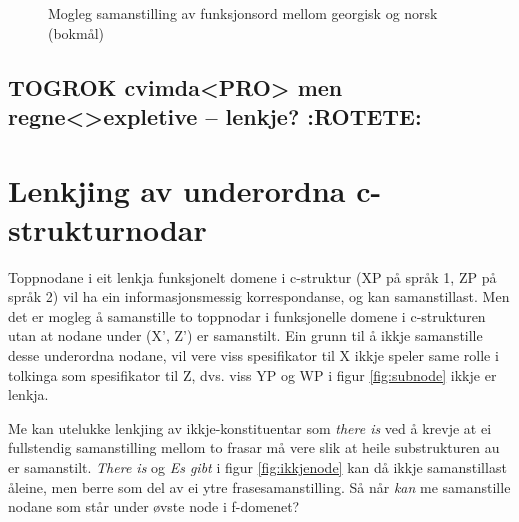 \documentclass[11pt,a4paper,oneside,draft]{book}
\begin{document}
  \begin{figure}[htp]
   \vfill{} %
  
  \caption{Mogleg samanstilling av funksjonsord mellom georgisk og norsk (bokmål)}
   \label{fig:fnord}
  \end{figure}
\subsection{\textbf{TOGROK} cvimda<PRO> men regne<>expletive -- lenkje? \textbf{:ROTETE:}}
\label{sec-3.8.1}


\section{Lenkjing av underordna c-strukturnodar}
\label{sec-3.9}

\label{SEC:subnode}

Toppnodane i eit lenkja funksjonelt domene i c-struktur (XP på språk
1, ZP på språk 2) vil ha ein informasjonsmessig korrespondanse, og kan
samanstillast. Men det er mogleg å samanstille to toppnodar i
funksjonelle domene i c-strukturen utan at nodane under (X', Z') er
samanstilt. Ein grunn til å ikkje samanstille desse underordna nodane,
vil vere viss spesifikator til X ikkje speler same rolle i tolkinga
som spesifikator til Z, dvs. viss YP og WP i figur \ref{fig:subnode}
ikkje er lenkja.


Me kan utelukke lenkjing av ikkje-konstituentar som \emph{there is} ved å
krevje at ei fullstendig samanstilling mellom to frasar må vere slik
at heile substrukturen au er samanstilt. \emph{There is} og \emph{Es gibt} i
figur \ref{fig:ikkjenode} kan då ikkje samanstillast åleine, men berre
som del av ei ytre frasesamanstilling.
Så når \emph{kan} me samanstille nodane som står under øvste node i
f-domenet?
\end{document}
